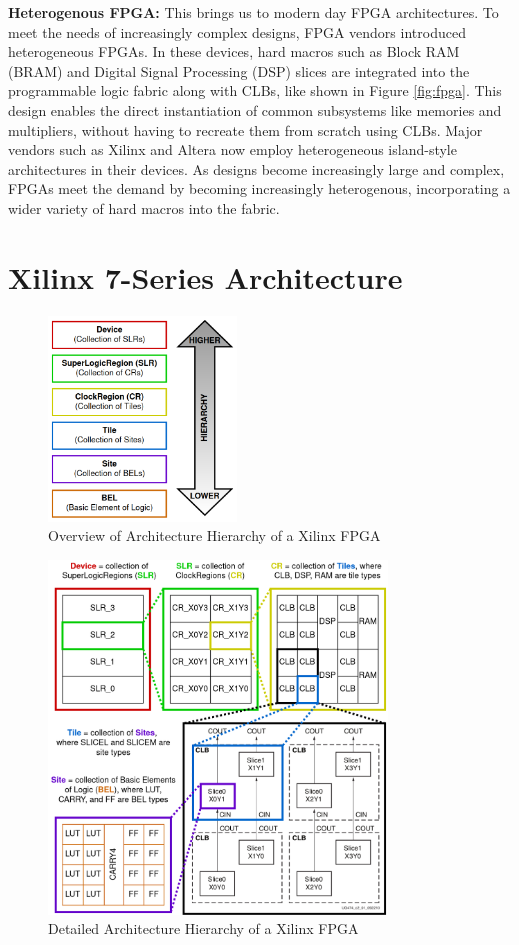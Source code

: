 \documentclass[twocolumn]{article}
\begin{document}
    \textbf{Heterogenous FPGA:} \quad 
    This brings us to modern day FPGA architectures. 
    To meet the needs of increasingly complex designs, FPGA vendors introduced heterogeneous FPGAs. 
    In these devices, hard macros such as Block RAM (BRAM) and Digital Signal Processing (DSP) slices are integrated into the programmable logic fabric along with CLBs, like shown in Figure \ref{fig:fpga}. 
    This design enables the direct instantiation of common subsystems like memories and multipliers, without having to recreate them from scratch using CLBs. 
    Major vendors such as Xilinx and Altera now employ heterogeneous island-style architectures in their devices. 
    As designs become increasingly large and complex, FPGAs meet the demand by becoming increasingly heterogenous, incorporating a wider variety of hard macros into the fabric. 


    \section{Xilinx 7-Series Architecture}
    \label{sec:7_series}

    \begin{figure}[]
        \centering
        \includegraphics[width=5.0cm]{figures/hierarchy_5.png}
        \caption{Overview of Architecture Hierarchy of a Xilinx FPGA}
        \label{fig:hierarchy_5}
    \end{figure}

    \begin{figure}[]
        \centering
        \includegraphics[width=9.0cm]{figures/hierarchy_4.png}
        \caption{Detailed Architecture Hierarchy of a Xilinx FPGA}
        \label{fig:hierarchy_4}
    \end{figure}
\end{document}
